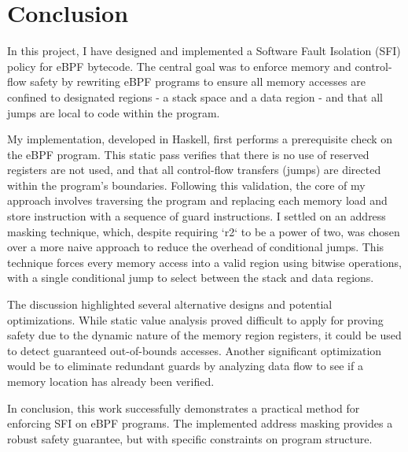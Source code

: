 \section{Conclusion}\label{sec:conclusion}

In this project, I have designed and implemented a Software Fault Isolation
(SFI) policy for eBPF bytecode. The central goal was to enforce memory and
control-flow safety by rewriting eBPF programs to ensure all memory accesses
are confined to designated regions - a stack space and a data region - and that
all jumps are local to code within the program.

My implementation, developed in Haskell, first performs a prerequisite check on
the eBPF program. This static pass verifies that there is no use of reserved
registers are not used, and that all control-flow transfers (jumps) are
directed within the program's boundaries. Following this validation, the core
of my approach involves traversing the program and replacing each memory load
and store instruction with a sequence of guard instructions. I settled on an
address masking technique, which, despite requiring `r2` to be a power of two,
was chosen over a more naive approach to reduce the overhead of conditional
jumps. This technique forces every memory access into a valid region using
bitwise operations, with a single conditional jump to select between the stack
and data regions.

The discussion highlighted several alternative designs and potential
optimizations. While static value analysis proved difficult to apply for
proving safety due to the dynamic nature of the memory region registers, it
could be used to detect guaranteed out-of-bounds accesses. Another significant
optimization would be to eliminate redundant guards by analyzing data flow to
see if a memory location has already been verified.

In conclusion, this work successfully demonstrates a practical method for
enforcing SFI on eBPF programs. The implemented address masking provides a
robust safety guarantee, but with specific constraints on program structure.
